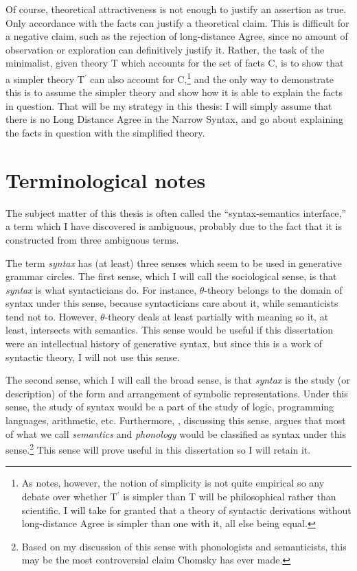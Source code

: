 Of course, theoretical attractiveness is not enough to justify an assertion as true.
Only accordance with the facts can justify a theoretical claim.
This is difficult for a negative claim, such as the rejection of long-distance Agree, since no amount of observation or exploration can definitively justify it.
Rather, the task of the minimalist, given theory T which accounts for the set of facts C, is to show that a simpler theory T$^\prime$ can also account for C,\footnote{
As \textcite{chomsky1965aspects} notes, however, the notion of simplicity is not quite empirical so any debate over whether T$^\prime$ is simpler than T will be philosophical rather than scientific.
I will take for granted that a theory of syntactic derivations without long-distance Agree is simpler than one with it, all else being equal.}
 and the only way to demonstrate this is to assume the simpler theory and show how it is able to explain the facts in question.
That will be my strategy in this thesis: I will simply assume that there is no Long Distance Agree in the Narrow Syntax, and go about explaining the facts in question with the simplified theory.
\section{Terminological notes}
The subject matter of this thesis is often called the ``syntax-semantics interface,'' a term which I have discovered is ambiguous, probably due to the fact that it is constructed from three ambiguous terms.

The term \textit{syntax} has (at least) three senses which seem to be used in generative grammar circles.
The first sense, which I will call the sociological sense, is that \textit{syntax} is what syntacticians do.
For instance, $\theta$-theory belongs to the domain of syntax under this sense, because syntacticians care about it, while semanticists tend not to.
However, $\theta$-theory deals at least partially with meaning so it, at least, intersects with semantics.
This sense would be useful if this dissertation were an intellectual history of generative syntax, but since this is a work of syntactic theory, I will not use this sense.

The second sense, which I will call the broad sense, is that \textit{syntax} is the study (or description) of the form and arrangement of symbolic representations.
Under this sense, the study of syntax would be a part of the study of logic, programming languages, arithmetic, etc.
Furthermore, \textcite[174]{chomsky2000new}, discussing this sense, argues that most of what we call \textit{semantics} and \textit{phonology} would be classified as syntax under this sense.\footnote{Based on my discussion of this sense with phonologists and semanticists, this may be the most controversial claim Chomsky has ever made.}
This sense will prove useful in this dissertation so I will retain it.

